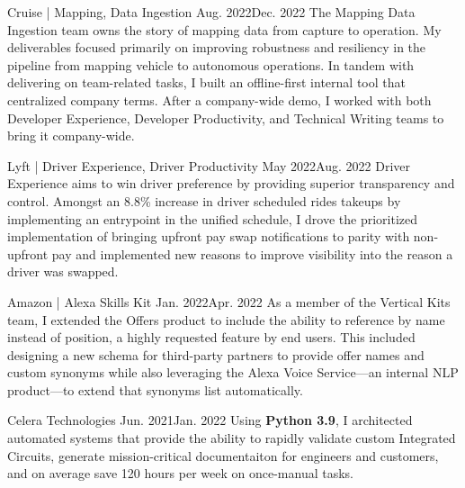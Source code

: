 \documentclass{listofpersonalprofessionalachievements}
\begin{document}
\begin{itemize}

    {Cruise | Mapping, Data Ingestion}
    {Aug. 2022}{Dec. 2022}
    {
        The Mapping Data Ingestion team owns the story of mapping data from capture to operation.
        My deliverables focused primarily on improving robustness and resiliency in the pipeline from mapping vehicle to autonomous operations.
        In tandem with delivering on team-related tasks, I built an offline-first internal tool that centralized company terms.
        After a company-wide demo, I worked with both Developer Experience, Developer Productivity, and Technical Writing teams to bring it company-wide.
    }

    {Lyft | Driver Experience, Driver Productivity}
    {May 2022}{Aug. 2022}
    {
        Driver Experience aims to win driver preference by providing superior transparency and control.
        Amongst an 8.8\% increase in driver scheduled rides takeups by implementing an entrypoint in the unified schedule, I drove the prioritized implementation of bringing upfront pay swap notifications to parity with non-upfront pay and implemented new reasons to improve visibility into the reason a driver was swapped.
    }

    {Amazon | Alexa Skills Kit}
    {Jan. 2022}{Apr. 2022}
    {
        As a member of the Vertical Kits team, I extended the Offers product to include the ability to reference by name instead of position, a highly requested feature by end users.
        This included designing a new schema for third-party partners to provide offer names and custom synonyms while also leveraging the Alexa Voice Service—an internal NLP product—to extend that synonyms list automatically.
    }

    {Celera Technologies}
    {Jun. 2021}{Jan. 2022}
    {
        Using \textbf{Python 3.9}, I architected automated systems that provide the ability to rapidly validate custom Integrated Circuits, generate mission-critical documentaiton for engineers and customers, and on average save 120 hours per week on once-manual tasks.
    }
\end{itemize}
\end{document}
